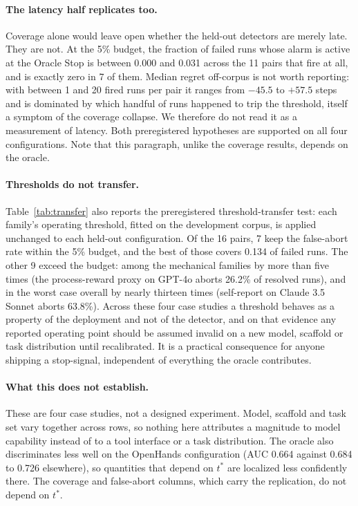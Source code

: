 \documentclass[sigconf,screen]{acmart}
\begin{document}
\paragraph{The latency half replicates too.} Coverage alone would leave open whether the held-out
detectors are merely late. They are not. At the 5\% budget, the fraction of failed runs whose alarm
is active at the Oracle Stop is between 0.000 and 0.031 across the 11 pairs that fire at all, and is
exactly zero in 7 of them. Median regret off-corpus is not worth reporting: with between 1 and 20
fired runs per pair it ranges from $-45.5$ to $+57.5$ steps and is dominated by which handful of
runs happened to trip the threshold, itself a symptom of the coverage collapse. We therefore do
not read it as a measurement of latency. Both preregistered hypotheses are supported on all four
configurations. Note that this paragraph, unlike the coverage results, depends on the oracle.

\paragraph{Thresholds do not transfer.} Table~\ref{tab:transfer} also reports the preregistered
threshold-transfer test: each family's operating threshold, fitted on the development corpus, is
applied unchanged to each held-out configuration. Of the 16 pairs, 7 keep the false-abort rate
within the 5\% budget, and the best of those covers 0.134 of failed runs. The other 9 exceed the
budget: among the mechanical families by more than five times (the process-reward proxy on GPT-4o
aborts 26.2\% of resolved runs), and in the worst case overall by nearly thirteen times (self-report
on Claude 3.5 Sonnet aborts 63.8\%).
Across these four case studies a threshold behaves as a property of the deployment and not of
the detector, and on that evidence any reported operating point should be assumed invalid on a new
model, scaffold or task distribution until recalibrated. It is a practical consequence for anyone
shipping a stop-signal, independent of everything the oracle contributes.

\paragraph{What this does not establish.} These are four case studies, not a designed experiment.
Model, scaffold and task set vary together across rows, so nothing here attributes a magnitude to
model capability instead of to a tool interface or a task distribution. The oracle also
discriminates less well on the OpenHands configuration (AUC 0.664 against 0.684 to 0.726
elsewhere), so quantities that depend on $t^{*}$ are localized less confidently there. The coverage
and false-abort columns, which carry the replication, do not depend on $t^{*}$.
\end{document}
